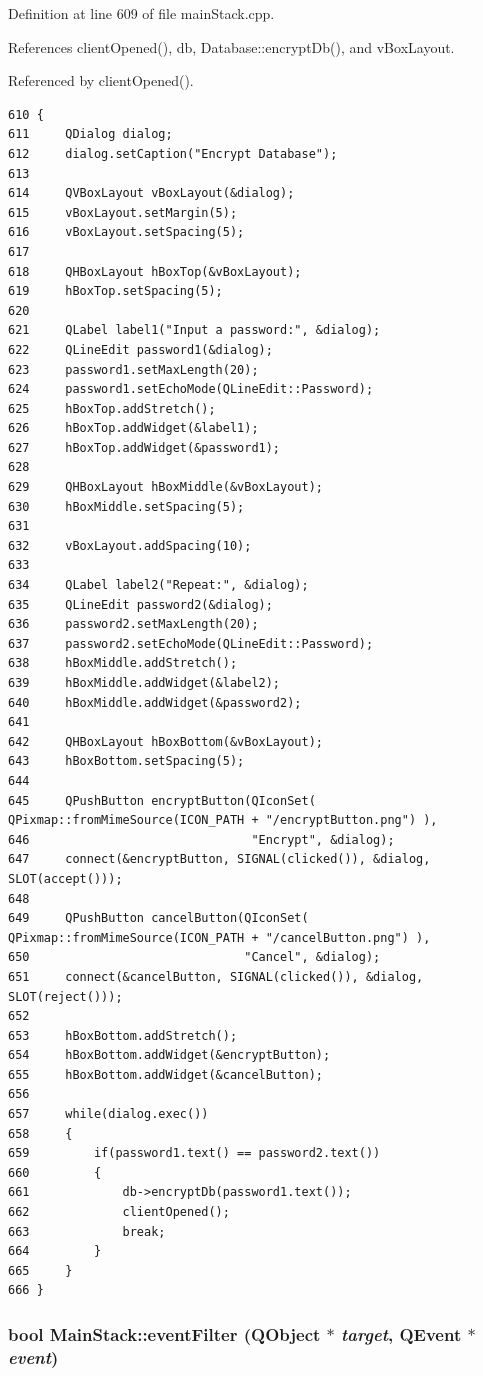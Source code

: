 Definition at line 609 of file main\-Stack.cpp.

References client\-Opened(), db, Database::encrypt\-Db(), and v\-Box\-Layout.

Referenced by client\-Opened().

\footnotesize\begin{verbatim}610 {
611     QDialog dialog;
612     dialog.setCaption("Encrypt Database");
613     
614     QVBoxLayout vBoxLayout(&dialog);
615     vBoxLayout.setMargin(5);
616     vBoxLayout.setSpacing(5);
617     
618     QHBoxLayout hBoxTop(&vBoxLayout);
619     hBoxTop.setSpacing(5);
620     
621     QLabel label1("Input a password:", &dialog);
622     QLineEdit password1(&dialog);
623     password1.setMaxLength(20);
624     password1.setEchoMode(QLineEdit::Password);
625     hBoxTop.addStretch();
626     hBoxTop.addWidget(&label1);
627     hBoxTop.addWidget(&password1);
628     
629     QHBoxLayout hBoxMiddle(&vBoxLayout);
630     hBoxMiddle.setSpacing(5);
631 
632     vBoxLayout.addSpacing(10);
633     
634     QLabel label2("Repeat:", &dialog);
635     QLineEdit password2(&dialog);
636     password2.setMaxLength(20);
637     password2.setEchoMode(QLineEdit::Password);
638     hBoxMiddle.addStretch();
639     hBoxMiddle.addWidget(&label2);
640     hBoxMiddle.addWidget(&password2);
641     
642     QHBoxLayout hBoxBottom(&vBoxLayout);
643     hBoxBottom.setSpacing(5);
644     
645     QPushButton encryptButton(QIconSet( QPixmap::fromMimeSource(ICON_PATH + "/encryptButton.png") ),
646                               "Encrypt", &dialog);
647     connect(&encryptButton, SIGNAL(clicked()), &dialog, SLOT(accept()));
648     
649     QPushButton cancelButton(QIconSet( QPixmap::fromMimeSource(ICON_PATH + "/cancelButton.png") ),
650                              "Cancel", &dialog);
651     connect(&cancelButton, SIGNAL(clicked()), &dialog, SLOT(reject()));
652     
653     hBoxBottom.addStretch();
654     hBoxBottom.addWidget(&encryptButton);
655     hBoxBottom.addWidget(&cancelButton);
656     
657     while(dialog.exec())
658     {
659         if(password1.text() == password2.text())
660         {
661             db->encryptDb(password1.text());
662             clientOpened();
663             break;
664         }
665     }
666 }
\end{verbatim}\normalsize 


\hypertarget{classMainStack_d2}{
\subsubsection[eventFilter]{\setlength{\rightskip}{0pt plus 5cm}bool Main\-Stack::event\-Filter (QObject $\ast$ {\em target}, QEvent $\ast$ {\em event})}}
\label{classMainStack_d2}


